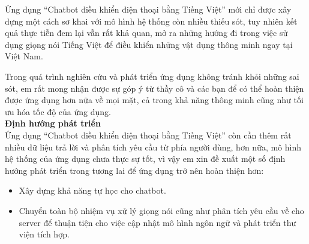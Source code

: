 \documentclass[12pt]{report}
\begin{document}
Ứng dụng ``Chatbot điều khiển điện thoại bằng Tiếng Việt'' mới chỉ được xây dựng một cách sơ khai với mô hình hệ thống còn nhiều thiếu sót, tuy nhiên kết quả thực tiễn đem lại vẫn rất khả quan, mở ra những hướng đi trong việc sử dụng giọng nói Tiếng Việt để điều khiển những vật dụng thông minh ngay tại Việt Nam.

Trong quá trình nghiên cứu và phát triển ứng dụng không tránh khỏi những sai sót, em rất mong nhận được sự góp ý từ thầy cô và các bạn để có thể hoàn thiện được ứng dụng hơn nữa về mọi mặt, cả trong khả năng thông minh cũng như tối ưu hóa tốc độ của ứng dụng. \\[0.4cm]
\noindent \textbf{\large Định hướng phát triển\\[0.4cm]}
Ứng dụng ``Chatbot điều khiển điện thoại bằng Tiếng Việt'' còn cần thêm rất nhiều dữ liệu trả lời và phân tích yêu cầu từ phía người dùng, hơn nữa, mô hình hệ thống của ứng dụng chưa thực sự tốt, vì vậy em xin đề xuất một số định hướng phát triển trong tương lai để ứng dụng trở nên hoàn thiện hơn:

\begin{itemize}
	\item Xây dựng khả năng tự học cho chatbot.
	\item Chuyển toàn bộ nhiệm vụ xử lý giọng nói cũng như phân tích yêu cầu về cho server để thuận tiện cho việc cập nhật mô hình ngôn ngữ và phát triển thư viện tích hợp.
\end{itemize}
\end{document}

